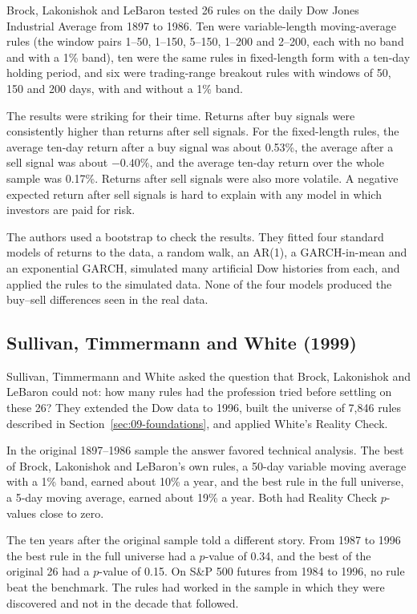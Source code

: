 Brock, Lakonishok and LeBaron tested 26 rules on the daily Dow Jones Industrial Average from 1897 to 1986. Ten were variable-length moving-average rules (the window pairs 1--50, 1--150, 5--150, 1--200 and 2--200, each with no band and with a 1\% band), ten were the same rules in fixed-length form with a ten-day holding period, and six were trading-range breakout rules with windows of 50, 150 and 200 days, with and without a 1\% band.

The results were striking for their time. Returns after buy signals were consistently higher than returns after sell signals. For the fixed-length rules, the average ten-day return after a buy signal was about 0.53\%, the average after a sell signal was about $-0.40\%$, and the average ten-day return over the whole sample was 0.17\%. Returns after sell signals were also more volatile. A negative expected return after sell signals is hard to explain with any model in which investors are paid for risk.

The authors used a bootstrap to check the results. They fitted four standard models of returns to the data, a random walk, an AR(1), a GARCH-in-mean and an exponential GARCH, simulated many artificial Dow histories from each, and applied the rules to the simulated data. None of the four models produced the buy--sell differences seen in the real data.

\subsection{Sullivan, Timmermann and White (1999)}

Sullivan, Timmermann and White asked the question that Brock, Lakonishok and LeBaron could not: how many rules had the profession tried before settling on these 26? They extended the Dow data to 1996, built the universe of 7,846 rules described in Section~\ref{sec:09-foundations}, and applied White's Reality Check.

In the original 1897--1986 sample the answer favored technical analysis. The best of Brock, Lakonishok and LeBaron's own rules, a 50-day variable moving average with a 1\% band, earned about 10\% a year, and the best rule in the full universe, a 5-day moving average, earned about 19\% a year. Both had Reality Check $p$-values close to zero.

The ten years after the original sample told a different story. From 1987 to 1996 the best rule in the full universe had a $p$-value of 0.34, and the best of the original 26 had a $p$-value of 0.15. On S\&P 500 futures from 1984 to 1996, no rule beat the benchmark. The rules had worked in the sample in which they were discovered and not in the decade that followed.

